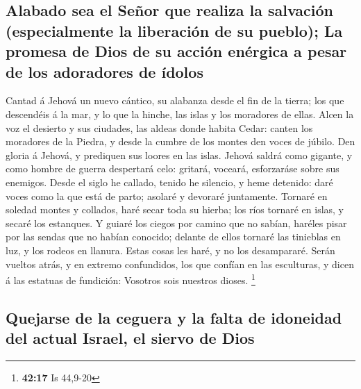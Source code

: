 \hypertarget{alabado-sea-el-seuxf1or-que-realiza-la-salvaciuxf3n-especialmente-la-liberaciuxf3n-de-su-pueblo-la-promesa-de-dios-de-su-acciuxf3n-enuxe9rgica-a-pesar-de-los-adoradores-de-uxeddolos}{%
\subsection{Alabado sea el Señor que realiza la salvación (especialmente
la liberación de su pueblo); La promesa de Dios de su acción enérgica a
pesar de los adoradores de
ídolos}\label{alabado-sea-el-seuxf1or-que-realiza-la-salvaciuxf3n-especialmente-la-liberaciuxf3n-de-su-pueblo-la-promesa-de-dios-de-su-acciuxf3n-enuxe9rgica-a-pesar-de-los-adoradores-de-uxeddolos}}

 Cantad á Jehová un nuevo cántico, su alabanza desde el fin
de la tierra; los que descendéis á la mar, y lo que la hinche, las islas
y los moradores de ellas.  Alcen la voz el desierto y sus
ciudades, las aldeas donde habita Cedar: canten los moradores de la
Piedra, y desde la cumbre de los montes den voces de júbilo.
 Den gloria á Jehová, y prediquen sus loores en las islas.
 Jehová saldrá como gigante, y como hombre de guerra
despertará celo: gritará, voceará, esforzaráse sobre sus enemigos.
 Desde el siglo he callado, tenido he silencio, y heme
detenido: daré voces como la que está de parto; asolaré y devoraré
juntamente.  Tornaré en soledad montes y collados, haré
secar toda su hierba; los ríos tornaré en islas, y secaré los estanques.
 Y guiaré los ciegos por camino que no sabían, haréles
pisar por las sendas que no habían conocido; delante de ellos tornaré
las tinieblas en luz, y los rodeos en llanura. Estas cosas les haré, y
no los desampararé.  Serán vueltos atrás, y en extremo
confundidos, los que confían en las esculturas, y dicen á las estatuas
de fundición: Vosotros sois nuestros dioses. \footnote{\textbf{42:17} Is
  44,9-20}

\hypertarget{quejarse-de-la-ceguera-y-la-falta-de-idoneidad-del-actual-israel-el-siervo-de-dios}{%
\subsection{Quejarse de la ceguera y la falta de idoneidad del actual
Israel, el siervo de
Dios}\label{quejarse-de-la-ceguera-y-la-falta-de-idoneidad-del-actual-israel-el-siervo-de-dios}}

